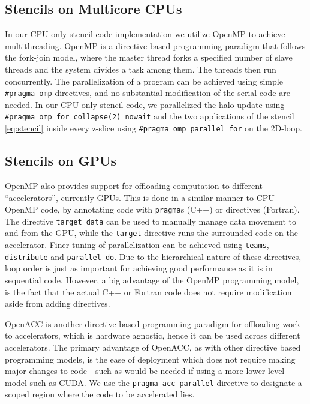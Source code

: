 \subsection{Stencils on Multicore CPUs}
In our CPU-only stencil code implementation we utilize OpenMP to achieve multithreading. 
OpenMP is a directive based programming paradigm that follows the fork-join model, where the master thread forks a specified number of slave threads and the system divides a task among them.
The threads then run concurrently.
The parallelization of a program can be achieved using simple \texttt{\#pragma omp} directives, and no substantial modification of the serial code are needed.
In our CPU-only stencil code, we parallelized the halo update using \texttt{\#pragma omp for collapse(2) nowait} and the two applications of the stencil \cref{eq:stencil} inside every z-slice using \texttt{\#pragma omp parallel for} on the 2D-loop.

\subsection{Stencils on GPUs}
OpenMP also provides support for offloading computation to different ``accelerators'', currently GPUs. This is done in a similar manner to CPU OpenMP code, by annotating code with \texttt{pragma}s (C++) or directives (Fortran). The directive \texttt{target data} can be used to manually manage data movement to and from the GPU, while the \texttt{target} directive runs the surrounded code on the accelerator. Finer tuning of parallelization can be achieved using \texttt{teams}, \texttt{distribute} and \texttt{parallel do}. Due to the hierarchical nature of these directives, loop order is just as important for achieving good performance as it is in sequential code. However, a big advantage of the OpenMP programming model, is the fact that the actual C++ or Fortran code does not require modification aside from adding directives.

OpenACC is another directive based programming paradigm for offloading work to accelerators, which is hardware agnostic, hence it can be used across different accelerators. The primary advantage of OpenACC, as with other directive based programming models, is the ease of deployment which does not require making major changes to code - such as would be needed if using a more lower level model such as CUDA. We use the \texttt{pragma acc parallel} directive to designate a scoped region where the code to be accelerated lies.  

